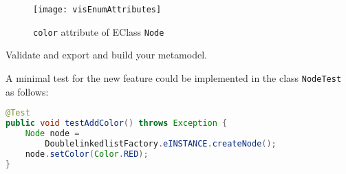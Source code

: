 \begin{stepbystep}
\begin{figure}[htbp]
    \begin{center} 
        \texttt{[image: visEnumAttributes]}
        \caption{\texttt{color} attribute of EClass \texttt{Node}}
        \label{enums:vis:colorAttribute}
    \end{center}
\end{figure}

\item 
Validate and export and build your metamodel.

\item 
A minimal test for the new feature could be implemented in the class
\texttt{NodeTest} as follows:
\begin{lstlisting}[language=Java,caption={Test for coloring nodes}]
@Test
public void testAddColor() throws Exception {
	Node node = 
	    DoublelinkedlistFactory.eINSTANCE.createNode();
	node.setColor(Color.RED);
}
\end{lstlisting}

\end{stepbystep}
